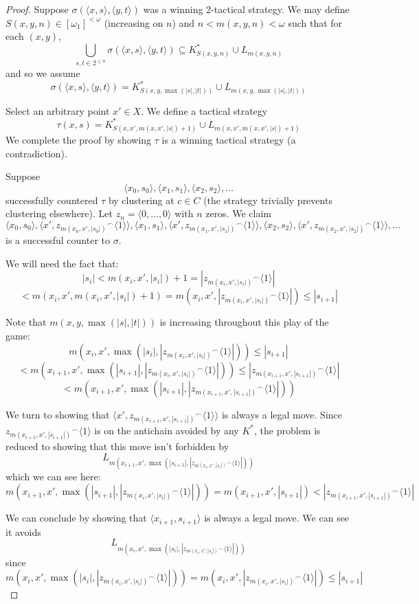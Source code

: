 \documentclass[11pt]{article}
\theoremstyle{plain}
\theoremstyle{definition}
\theoremstyle{remark}
\newcommand{\<}{\langle}
\renewcommand{\>}{\rangle}
\begin{document}
\begin{proof}
Suppose $\sigma(\<x,s\>,\<y,t\>)$ was a winning 2-tactical strategy. We may define $S(x,y,n)\in [\omega_1]^{<\omega}$ (increasing on $n$) and $n<m(x,y,n)<\omega$ such that for each $(x,y)$,
  \[
    \bigcup_{s,t \in 2^{\leq n}} \sigma(\<x,s\>,\<y,t\>) \subseteq 
    K^*_{S(x,y,n)} \cup L_{m(x,y,n)}
  \]
and so we assume
  \[
    \sigma(\<x,s\>,\<y,t\>) =
    K^*_{S(x,y,\max(|s|,|t|))} \cup L_{m(x,y,\max(|s|,|t|))}
  \]

Select an arbitrary point $x' \in X$. We define a tactical strategy 
  \[
  \tau(x,s) = 
  K^*_{S(x,x',m(x,x',|s|)+1)} \cup L_{m(x,x',m(x,x',|s|)+1)}
  \]
We complete the proof by showing $\tau$ is a winning tactical strategy (a contradiction).

Suppose
\[
\<x_0, s_0\>, \<x_1, s_1\>, \<x_2, s_2\>, \dots
\]
successfully countered $\tau$ by clustering at $c\in C$ (the strategy trivially prevents clustering elsewhere). Let $z_n = \<0,\dots,0\>$ with $n$ zeros. We claim
\[
\<x_0, s_0\>, \<x', {z_{m(x_0,x',|s_0|)}}^\frown\<1\>\>, \<x_1, s_1\>, \<x', {z_{m(x_1,x',|s_1|)}}^\frown\<1\>\>,  \<x_2, s_2\>, \<x', {z_{m(x_2,x',|s_2|)}}^\frown\<1\>\>, \dots
\]
is a successful counter to $\sigma$.

We will need the fact that:
  \[
    |s_i| <
    m(x_i,x',|s_i|)+1 =
    |{z_{m(x_i,x',|s_i|)}}^\frown\<1\>| 
  \]
  \[
    <
    m(x_i,x',m(x_i,x',|s_i|)+1) =
    m(x_i,x',|{z_{m(x_i,x',|s_i|)}}^\frown\<1\>|) \leq
    |s_{i+1}|
  \]

Note that $m(x,y,\max(|s|,|t|))$ is increasing throughout this play of the game:
  \[
    m(x_i,x',\max(|s_i|,|{z_{m(x_i,x',|s_i|)}}^\frown\<1\>|))
    \leq
    |s_{i+1}| 
  \]
  \[
    <
    m(x_{i+1},x',\max(|s_{i+1}|,|{z_{m(x_i,x',|s_i|)}}^\frown\<1\>|))
    \leq
    |{z_{m(x_{i+1},x',|s_{i+1}|)}}^\frown\<1\>|
  \]
  \[
    <
    m(x_{i+1},x',\max(|s_{i+1}|,|{z_{m(x_{i+1},x',|s_{i+1}|)}}^\frown\<1\>|))
  \]

We turn to showing that $\<x', {z_{m(x_{i+1},x',|s_{i+1}|)}}^\frown\<1\>\>$ is always a legal move. Since ${z_{m(x_{i+1},x',|s_{i+1}|)}}^\frown\<1\>$ is on the antichain avoided by any $K^*$, the problem is reduced to showing that this move isn't forbidden by
  \[
  L_{m(x_{i+1},x',\max(|s_{i+1}|,|{z_{m(x_i,x',|s_i|)}}^\frown\<1\>|))}
  \]
which we can see here:
  \[
    m(x_{i+1},x',\max(|s_{i+1}|,|{z_{m(x_i,x',|s_i|)}}^\frown\<1\>|)) =
    m(x_{i+1},x',|s_{i+1}|) <
    |{z_{m(x_{i+1},x',|s_{i+1}|)}}^\frown\<1\>|
  \]

We can conclude by showing that $\<x_{i+1},s_{i+1}\>$ is always a legal move. We can see it avoids 
  \[
  L_{m(x_{i},x',\max(|s_{i}|,|{z_{m(x_i,x',|s_i|)}}^\frown\<1\>|))}
  \]
since
  \[
    m(x_{i},x',\max(|s_{i}|,|{z_{m(x_i,x',|s_i|)}}^\frown\<1\>|)) =
    m(x_{i},x',|{z_{m(x_i,x',|s_i|)}}^\frown\<1\>|) \leq
    |s_{i+1}|
  \]


\end{proof}
\end{document}
